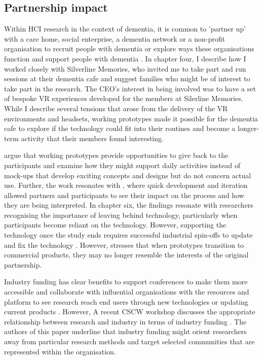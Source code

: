 \subsection{Partnership impact}
Within HCI research in the context of dementia, it is common to 'partner up' with a care home, social enterprise, a dementia network or a non-profit organisation to recruit people with dementia or explore ways these organisations function and support people with dementia \citep{bartlett2019strategies}. In chapter four, I describe how I worked closely with Silverline Memories, who invited me to take part and run sessions at their dementia cafe and suggest families who might be of interest to take part in the research. The CEO's interest in being involved was to have a set of bespoke VR experiences developed for the members at Silerline Memories. While I describe several tensions that arose from the delivery of the VR environments and headsets, working prototypes made it possible for the dementia cafe to explore if the technology could fit into their routines and become a longer-term activity that their members found interesting. 

\cite{bodker2018participatory} argue that working prototypes provide opportunities to give back to the participants and examine how they might support daily activities instead of mock-ups that develop exciting concepts and designs but do not concern actual use. Further, the work resonates with \cite{lindsay_empathy_2012}, where quick development and iteration allowed partners and participants to see their impact on the process and how they are being interpreted. In chapter six, the findings resonate with researchers recognising the importance of leaving behind technology, particularly when participants become reliant on the technology. However, supporting the technology once the study ends requires successful industrial spin-offs to update and fix the technology \cite{gitau2009fair}. However, \cite{chilana2015user} stresses that when prototypes transition to commercial products, they may no longer resemble the interests of the original partnership.

Industry funding has clear benefits to support conferences to make them more accessible and collaborate with influential organisations with the resources and platform to see research reach end users through new technologies or updating current products \citep{grudin2017tool}. However, A recent CSCW workshop discusses the appropriate relationship between research and industry in terms of industry funding \citep{group_patron_2019}. The authors of this paper underline that industry funding might orient researchers away from particular research methods and target selected communities that are represented within the organisation.


